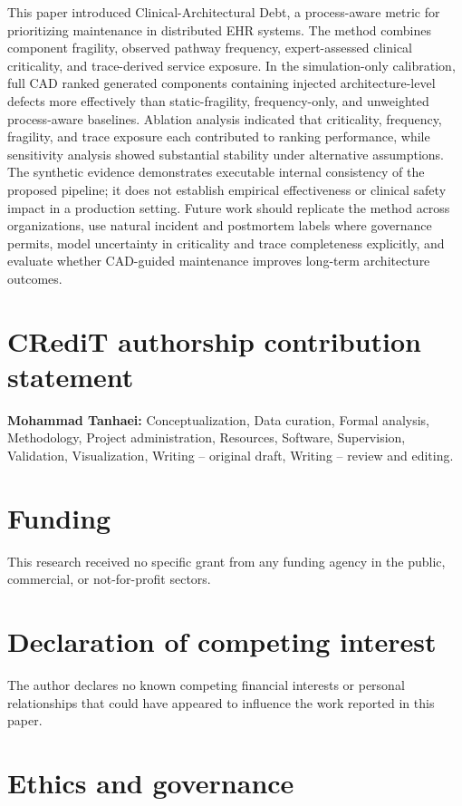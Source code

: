 \documentclass[english,preprint]{elsarticle}
\newcommand{\CAD}{\textsc{CAD}\xspace}
\begin{document}
This paper introduced Clinical-Architectural Debt, a process-aware metric for prioritizing maintenance in distributed EHR systems. The method combines component fragility, observed pathway frequency, expert-assessed clinical criticality, and trace-derived service exposure. In the simulation-only calibration, full \CAD ranked generated components containing injected architecture-level defects more effectively than static-fragility, frequency-only, and unweighted process-aware baselines. Ablation analysis indicated that criticality, frequency, fragility, and trace exposure each contributed to ranking performance, while sensitivity analysis showed substantial stability under alternative assumptions. The synthetic evidence demonstrates executable internal consistency of the proposed pipeline; it does not establish empirical effectiveness or clinical safety impact in a production setting. Future work should replicate the method across organizations, use natural incident and postmortem labels where governance permits, model uncertainty in criticality and trace completeness explicitly, and evaluate whether \CAD-guided maintenance improves long-term architecture outcomes.

\section*{CRediT authorship contribution statement}

\textbf{Mohammad Tanhaei:} Conceptualization, Data curation, Formal analysis, Methodology, Project administration, Resources, Software, Supervision, Validation, Visualization, Writing -- original draft, Writing -- review and editing.

\section*{Funding}

This research received no specific grant from any funding agency in the public, commercial, or not-for-profit sectors.

\section*{Declaration of competing interest}

The author declares no known competing financial interests or personal relationships that could have appeared to influence the work reported in this paper.

\section*{Ethics and governance}
\end{document}
